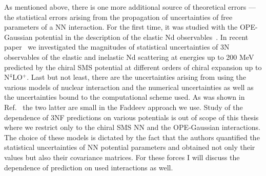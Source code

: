 As mentioned above, there is one more additional source of theoretical errors ---\\ the statistical errors arising from the propagation of uncertainties of free parameters of a NN interaction. For the first time, it was studied with the OPE-Gaussian potential in the description of the elastic Nd observables~\cite{Skibinski2018}. In recent paper~\cite{volkotrub2020uncertainty} we investigated the magnitudes of statistical uncertainties of 3N observables of the elastic and inelastic Nd scattering at energies up to 200 MeV predicted by the chiral SMS potential at different orders of chiral expansion up to N$^{4}$LO$^{+}$. Last but not least, there are the uncertainties arising from using the various models of nuclear interaction and the numerical uncertainties as well as the uncertainties bound to the computational scheme used. As was shown in Ref.~\cite{Skibinski2018} the two latter are small in the Faddeev approach we use. Study of the dependence of 3NF predictions on various potentials is out of scope of this thesis where we restrict only to the chiral SMS NN and the OPE-Gaussian interactions. The choice of these models is dictated by the fact that the authors quantified the statistical uncertainties of NN potential parameters and obtained not only their values but also their covariance matrices. For these forces I will discuss the dependence of prediction on used interactions as well.


